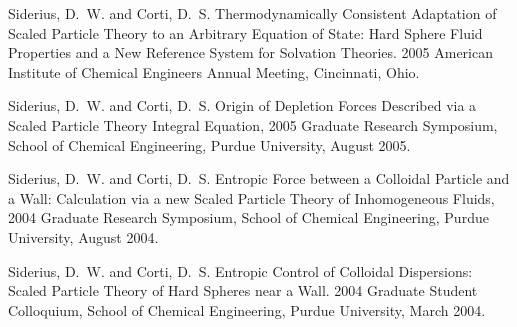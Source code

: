 Siderius, D.~W. and Corti, D.~S. Thermodynamically Consistent Adaptation of Scaled Particle Theory to an Arbitrary Equation of State: Hard Sphere Fluid Properties and a New Reference System for Solvation Theories. 2005 American Institute of Chemical Engineers Annual Meeting, Cincinnati, Ohio.

Siderius, D.~W. and Corti, D.~S. Origin of Depletion Forces Described via a Scaled Particle Theory Integral Equation, 2005 Graduate Research Symposium, School of Chemical Engineering, Purdue University, August 2005.

Siderius, D.~W. and Corti, D.~S. Entropic Force between a Colloidal Particle and a Wall: Calculation via a new Scaled Particle Theory of Inhomogeneous Fluids, 2004 Graduate Research Symposium, School of Chemical Engineering, Purdue University, August 2004.

Siderius, D.~W. and Corti, D.~S. Entropic Control of Colloidal Dispersions: Scaled Particle Theory of Hard Spheres near a Wall. 2004 Graduate Student Colloquium, School of Chemical Engineering, Purdue University, March 2004.
